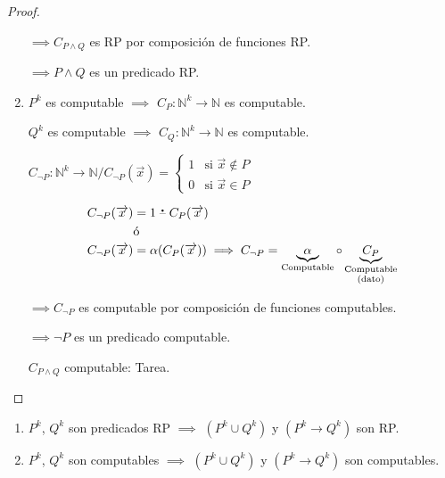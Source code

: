 \begin{proof}
\begin{enumerate}
            $\implies C_{P \wedge Q}$ es RP por composición de funciones RP.

            $\implies P \wedge Q$ es un predicado RP.

        \item ${P}^k$ es computable $\implies$ 
            $C_{{P}}: \mathbb{N}^k \to \mathbb{N}$ es computable.

            ${Q}^k$ es computable $\implies$ 
            $C_{{Q}}: \mathbb{N}^k \to \mathbb{N}$ es computable.

            $C_{\neg P}: \mathbb{N}^k \to \mathbb{N} /
            C_{\neg P} (\overrightarrow{x}) = 
            \begin{cases}
                1 & \text{si } \overrightarrow{x} \notin {P} \\
                0 & \text{si } \overrightarrow{x} \in {P}
            \end{cases}$

            \begin{align*}
                C_{\neg P} (\overrightarrow{x}) &= 
                1 \;\accentset{\mbox{\large\bfseries .}}{\text{--}}\; C_{P}(\overrightarrow{x})\\
                &\text{ó} \\
                C_{\neg P} (\overrightarrow{x}) &= 
                \alpha(C_{P}(\overrightarrow{x})) \implies C_{\neg P} 
                = \underbrace{\alpha}_{\text{Computable}} \circ 
                \underbrace{C_{{P}}}_{\substack{\text{Computable}\\
                    \text{(dato)}}}
            \end{align*}


            $\implies C_{\neg P}$ es computable por composición de funciones
            computables.

            $\implies \neg {P}$ es un predicado computable.

            \smallskip

            $C_{P \wedge Q}$ computable: Tarea.
    \end{enumerate}
\end{proof}

\begin{corolario}{}{}
    \begin{enumerate}
        \item ${P}^k$, ${Q}^k$ son predicados RP $\implies$
            $({P}^k \cup {Q}^k)$ y 
            $({P}^k \to {Q}^k)$ son RP.
        \item ${P}^k$, ${Q}^k$ son computables $\implies$
            $({P}^k \cup {Q}^k)$ y 
            $({P}^k \to {Q}^k)$ son computables.
    \end{enumerate}
\end{corolario}

